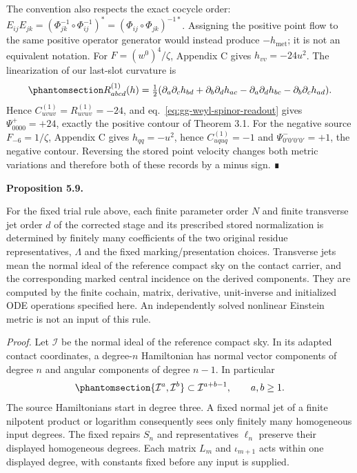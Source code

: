 \documentclass[
  english,
  11pt,
  reqno]{amsart}
\makeatletter
\newcommand{\pandocstatementheading}[1]{%
  \par\addpenalty{\@beginparpenalty}%
  \addvspace{.5\baselineskip plus .2\baselineskip minus .2\baselineskip}%
  {\normalfont\bfseries #1\par}%
  \nobreak\@afterindenttrue\@afterheading
}
\makeatother
\begin{document}
The convention also respects the exact cocycle order:
\(E_{ij}E_{jk}=(\Phi_{jk}^{-1}\circ\Phi_{ij}^{-1})^*
=(\Phi_{ij}\circ\Phi_{jk})^{-1*}\). Assigning the positive point flow to
the same positive operator generator would instead produce
\(-h_{\mathrm{met}}\); it is not an equivalent notation. For
\(F=(w^0)^4/\zeta\), Appendix C gives \(h_{vv}=-24u^2\). The
linearization of our last-slot curvature is
\begin{equation}\protect\phantomsection\label{eq:gg-last-slot-linear-curvature}{
 R^{(1)}_{abcd}(h)=\tfrac12
 (\partial_a\partial_ch_{bd}+\partial_b\partial_dh_{ac}
  -\partial_a\partial_dh_{bc}-\partial_b\partial_ch_{ad}).
}\end{equation} Hence \(C^{(1)}_{uvuv}=R^{(1)}_{uvuv}=-24\), and
eq.~\ref{eq:gg-weyl-spinor-readout} gives \(\Psi^+_{0000}=+24\), exactly
the positive contour of Theorem 3.1. For the negative source
\(F_{-6}=1/\zeta\), Appendix C gives \(h_{qq}=-u^2\), hence
\(C^{(1)}_{uquq}=-1\) and \(\Psi^-_{0'0'0'0'}=+1\), the negative
contour. Reversing the stored point velocity changes both metric
variations and therefore both of these records by a minus sign. ∎

\pandocstatementheading{\protect{}\label{prop:gg-finite-source-execution}Proposition 5.9.}

For the fixed trial rule above, each finite parameter order \(N\) and
finite transverse jet order \(d\) of the corrected stage and its
prescribed stored normalization is determined by finitely many
coefficients of the two original residue representatives, \(\Lambda\)
and the fixed marking/presentation choices. Transverse jets mean the
normal ideal of the reference compact sky on the contact carrier, and
the corresponding marked central incidence on the derived components.
They are computed by the finite cochain, matrix, derivative,
unit-inverse and initialized ODE operations specified here. An
independently solved nonlinear Einstein metric is not an input of this
rule.

\emph{Proof.} Let \(\mathcal I\) be the normal ideal of the reference
compact sky. In its adapted contact coordinates, a degree-\(n\)
Hamiltonian has normal vector components of degree \(n\) and angular
components of degree \(n-1\). In particular
\begin{equation}\protect\phantomsection\label{eq:gg-source-execution-filtration}{
 \{\mathcal I^a,\mathcal I^b\}
             \subset\mathcal I^{a+b-1},\qquad a,b\ge1.
}\end{equation} The source Hamiltonians start in degree three. A fixed
normal jet of a finite nilpotent product or logarithm consequently sees
only finitely many homogeneous input degrees. The fixed repairs \(S_n\)
and representatives \(\ell_n\) preserve their displayed homogeneous
degrees. Each matrix \(L_m\) and \(\iota_{m+1}\) acts within one
displayed degree, with constants fixed before any input is supplied.
\end{document}

